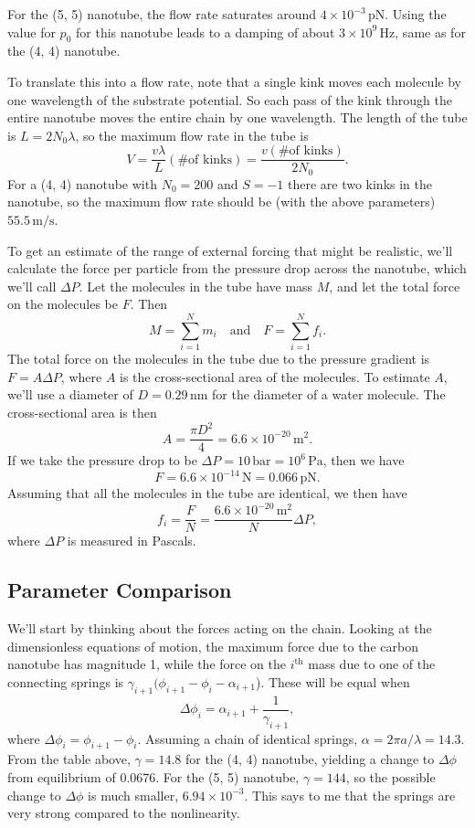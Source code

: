 \documentclass[11pt]{article}
\begin{document}
For the (5, 5) nanotube, the flow rate saturates around $4\times10^{-3}\,\text{pN}$. Using the value for $p_0$ for this nanotube leads to a damping of about $3\times10^9\,\text{Hz}$, same as for the (4, 4) nanotube.

To translate this into a flow rate, note that a single kink moves each molecule by one wavelength of the substrate potential. So each pass of the kink through the entire nanotube moves the entire chain by one wavelength. The length of the tube is $L=2N_0\lambda$, so the maximum flow rate in the tube is
\[
V = \frac{v\lambda}{L}(\text{\# of kinks})
	= \frac{v(\text{\# of kinks})}{2N_0}.
\]
For a (4, 4) nanotube with $N_0=200$ and $S=-1$ there are two kinks in the nanotube, so the maximum flow rate should be (with the above parameters) $55.5\,\text{m}/\text{s}$.

To get an estimate of the range of external forcing that might be realistic, we'll calculate the force per particle from the pressure drop across the nanotube, which we'll call $\Delta P$. Let the molecules in the tube have mass $M$, and let the total force on the molecules be $F$. Then
\[
M=\sum_{i=1}^N m_i\quad\text{and}\quad F=\sum_{i=1}^N f_i.
\]
The total force on the molecules in the tube due to the pressure gradient is $F=A\Delta P$, where $A$ is the cross-sectional area of the molecules. To estimate $A$, we'll use a diameter of $D=0.29\,\text{nm}$ for the diameter of a water molecule. The cross-sectional area is then
\[
A=\frac{\pi D^2}{4}=6.6\times10^{-20}\,\text{m}^2.
\]
If we take the pressure drop to be $\Delta P=10\,\text{bar}=10^6\,\text{Pa}$, then we have
\[
F=6.6\times10^{-14}\,\text{N}=0.066\,\text{pN}.
\]
Assuming that all the molecules in the tube are identical, we then have
\[
f_i=\frac{F}{N}=\frac{6.6\times10^{-20}\,\text{m}^2}{N}\Delta P,
\]
where $\Delta P$ is measured in Pascals.

\subsection{Parameter Comparison}

We'll start by thinking about the forces acting on the chain. Looking at the dimensionless equations of motion, the maximum force due to the carbon nanotube has magnitude 1, while the force on the $i^\text{th}$ mass due to one of the connecting springs is $\gamma_{i+1}(\phi_{i+1}-\phi_i-\alpha_{i+1}$). These will be equal when
\[
\Delta\phi_i=\alpha_{i+1}+\frac{1}{\gamma_{i+1}},
\]
where $\Delta\phi_i=\phi_{i+1}-\phi_i$. Assuming a chain of identical springs, $\alpha=2\pi a/\lambda=14.3$. From the table above, $\gamma=14.8$ for the (4, 4) nanotube, yielding a change to $\Delta\phi$ from equilibrium of 0.0676. For the (5, 5) nanotube, $\gamma=144$, so the possible change to $\Delta\phi$ is much smaller, $6.94\times10^{-3}$. This says to me that the springs are very strong compared to the nonlinearity.
\end{document}
